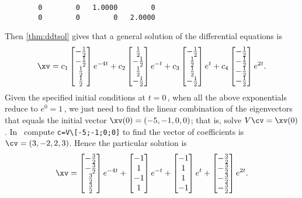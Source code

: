 \begin{example}
\begin{solution}
\begin{verbatim}
        0        0   1.0000        0
        0        0        0   2.0000
\end{verbatim}
Then \autoref{thm:ddtsol} gives that a general solution of the differential equations is
\begin{equation*}
\xv=
c_1\begin{bmatrix} -\tfrac12\\-\tfrac12\\\tfrac12\\\tfrac12 \end{bmatrix}e^{-4t}
+c_2\begin{bmatrix} \tfrac12\\-\tfrac12\\\tfrac12\\-\tfrac12 \end{bmatrix}e^{-t}
+c_3\begin{bmatrix} -\tfrac12\\\tfrac12\\\tfrac12\\-\tfrac12 \end{bmatrix}e^{t}
+c_4\begin{bmatrix} -\tfrac12\\-\tfrac12\\-\tfrac12\\-\tfrac12 \end{bmatrix}e^{2t}.
\end{equation*}
Given the specified initial conditions at \(t=0\)\,, when all the above exponentials reduce to \(e^0=1\)\,, we just need to find the linear combination of the eigenvectors that equals the initial vector \(\xv(0)=(-5,-1,0,0)\); that is, solve \(V\cv=\xv(0)\).
In \script\ compute \verb|c=V\[-5;-1;0;0]| to find the vector of coefficients is \(\cv=(3,-2,2,3)\).
Hence the particular solution is
\begin{equation*}
\xv=
\begin{bmatrix} -\tfrac32\\-\tfrac32\\\tfrac32\\\tfrac32 \end{bmatrix}e^{-4t}
+\begin{bmatrix} -1\\1\\-1\\1 \end{bmatrix}e^{-t}
+\begin{bmatrix} -1\\1\\1\\-1 \end{bmatrix}e^{t}
+\begin{bmatrix} -\tfrac32\\-\tfrac32\\-\tfrac32\\-\tfrac32 \end{bmatrix}e^{2t}.
\end{equation*}
\end{solution}
\end{example}








